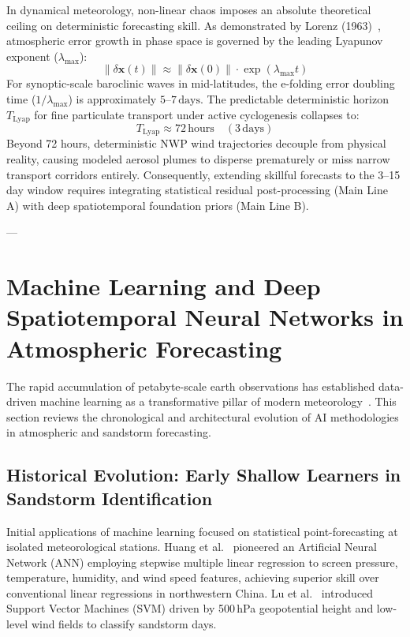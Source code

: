 In dynamical meteorology, non-linear chaos imposes an absolute theoretical ceiling on deterministic forecasting skill. As demonstrated by Lorenz (1963)~\cite{lorenz1963deterministic}, atmospheric error growth in phase space is governed by the leading Lyapunov exponent ($\lambda_{\text{max}}$):
\begin{equation}
\label{eq:lyapunov_divergence}
\|\delta \mathbf{x}(t)\| \approx \|\delta \mathbf{x}(0)\| \cdot \exp(\lambda_{\text{max}} t)
\end{equation}
For synoptic-scale baroclinic waves in mid-latitudes, the e-folding error doubling time ($1/\lambda_{\text{max}}$) is approximately $5\text{--}7\,\text{days}$. The predictable deterministic horizon $T_{\text{Lyap}}$ for fine particulate transport under active cyclogenesis collapses to:
\begin{equation}
\label{eq:t_lyap}
T_{\text{Lyap}} \approx 72\,\text{hours} \quad (3\,\text{days})
\end{equation}
Beyond 72 hours, deterministic NWP wind trajectories decouple from physical reality, causing modeled aerosol plumes to disperse prematurely or miss narrow transport corridors entirely. Consequently, extending skillful forecasts to the 3--15 day window requires integrating statistical residual post-processing (Main Line A) with deep spatiotemporal foundation priors (Main Line B).

---

\section{Machine Learning and Deep Spatiotemporal Neural Networks in Atmospheric Forecasting}
\label{sec:ml_review}

The rapid accumulation of petabyte-scale earth observations has established data-driven machine learning as a transformative pillar of modern meteorology~\cite{ref1,ref32,ref40}. This section reviews the chronological and architectural evolution of AI methodologies in atmospheric and sandstorm forecasting.

\subsection{Historical Evolution: Early Shallow Learners in Sandstorm Identification}
\label{subsec:early_ann_svm}

Initial applications of machine learning focused on statistical point-forecasting at isolated meteorological stations. Huang et al.~\cite{ref3} pioneered an Artificial Neural Network (ANN) employing stepwise multiple linear regression to screen pressure, temperature, humidity, and wind speed features, achieving superior skill over conventional linear regressions in northwestern China. Lu et al.~\cite{ref4} introduced Support Vector Machines (SVM) driven by 500\,hPa geopotential height and low-level wind fields to classify sandstorm days.

